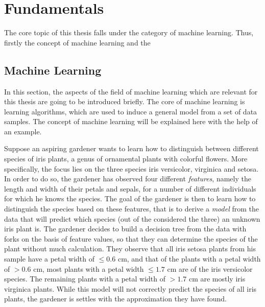 %
\chapter{Fundamentals}
\label{sec:fundamentals}

The core topic of this thesis falls under the category of machine learning. Thus, firstly the concept of machine learning and the   

\section{Machine Learning}
In this section, the aspects of the field of machine learning which are relevant for this thesis are going to be introduced briefly. The core of machine learning is learning algorithms, which are used to induce a general model from a set of data samples. The concept of machine learning will be explained here with the help of an example. %

Suppose an aspiring gardener wants to learn how to distinguish between different species of iris plants, a genus of ornamental plants with colorful flowers. More specifically, the focus lies on the three species iris versicolor, virginica and setosa. In order to do so, the gardener has observed four different \textit{features}, namely the length and width of their petals and sepals, for a number of different individuals for which he knows the species. The goal of the gardener is then to learn how to distinguish the species based on these features, that is to derive a \textit{model} from the data that will predict which species (out of the considered the three) an unknown iris plant is. The gardener decides to build a decision tree from the data with forks on the basis of feature values, so that they can determine the species of the plant without much calculation. They observe that all iris setosa plants from his sample have a petal width of $\leq 0.6 $ cm, and that of the plants with a petal width of $>0.6$ cm, most plants with a petal width $\leq 1.7$ cm are of the iris versicolor species. The remaining plants with a petal width of $>1.7$ cm are mostly iris virginica plants. While this model will not correctly predict the species of all iris plants, the gardener is settles with the approximation they have found.

